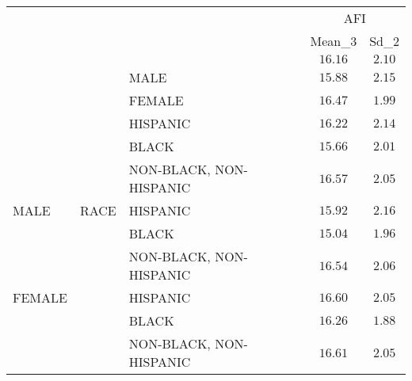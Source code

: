\begin{tabular}{lllcc}
\hline
& & & \multicolumn{2}{c}{AFI} \\ 
 &  &  & Mean_3 & \multicolumn{1}{c}{Sd_2} \\ 
\hline
 &  &   & $16.16$ & $2.10$ \\
 &  & \nopagebreak MALE  & $15.88$ & $2.15$ \\
 &  & \nopagebreak FEMALE  & $16.47$ & $1.99$ \\
 &  & \nopagebreak HISPANIC  & $16.22$ & $2.14$ \\
 &  & \nopagebreak BLACK  & $15.66$ & $2.01$ \\
 &  & \nopagebreak NON-BLACK, NON-HISPANIC  & $16.57$ & $2.05$ \\
\nopagebreak MALE & RACE & \nopagebreak HISPANIC  & $15.92$ & $2.16$ \\
 &  & \nopagebreak BLACK  & $15.04$ & $1.96$ \\
 &  & \nopagebreak NON-BLACK, NON-HISPANIC  & $16.54$ & $2.06$ \\
\nopagebreak FEMALE &  & \nopagebreak HISPANIC  & $16.60$ & $2.05$ \\
 &  & \nopagebreak BLACK  & $16.26$ & $1.88$ \\
 &  & \nopagebreak NON-BLACK, NON-HISPANIC  & $16.61$ & $2.05$ \\
\hline 
\end{tabular}
